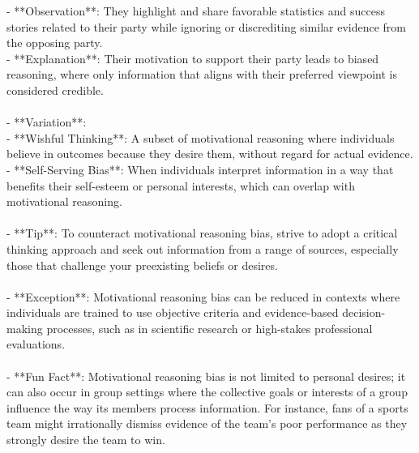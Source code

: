 \documentclass[a4paper,12pt,single,pdftex]{scrartcl}
\begin{document}
    
        - **Observation**: They highlight and share favorable statistics and success stories related to their party while ignoring or discrediting similar evidence from the opposing party.
    \\

    
        - **Explanation**: Their motivation to support their party leads to biased reasoning, where only information that aligns with their preferred viewpoint is considered credible.
    \\

    
      
    \\

    
      - **Variation**:
    \\

    
        - **Wishful Thinking**: A subset of motivational reasoning where individuals believe in outcomes because they desire them, without regard for actual evidence.
    \\

    
        - **Self-Serving Bias**: When individuals interpret information in a way that benefits their self-esteem or personal interests, which can overlap with motivational reasoning.
    \\

    
      
    \\

    
      - **Tip**: To counteract motivational reasoning bias, strive to adopt a critical thinking approach and seek out information from a range of sources, especially those that challenge your preexisting beliefs or desires.
    \\

    
      
    \\

    
      - **Exception**: Motivational reasoning bias can be reduced in contexts where individuals are trained to use objective criteria and evidence-based decision-making processes, such as in scientific research or high-stakes professional evaluations.
    \\

    
      
    \\

    
      - **Fun Fact**: Motivational reasoning bias is not limited to personal desires; it can also occur in group settings where the collective goals or interests of a group influence the way its members process information. For instance, fans of a sports team might irrationally dismiss evidence of the team's poor performance as they strongly desire the team to win.
    \\
\end{document}
